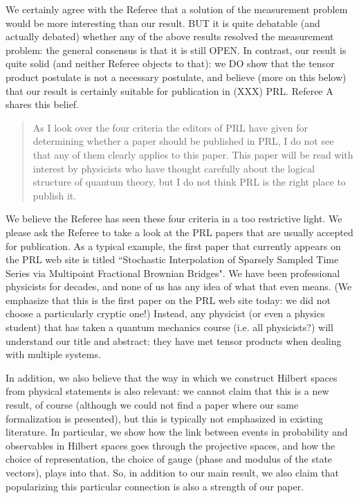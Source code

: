 \documentclass[11pt]{article}
\begin{document}
We certainly agree with the Referee that a solution of the measurement
problem would be more interesting than our result. BUT it is quite
debatable (and actually debated) whether any of the above results
resolved the measurement problem: the general consensus is that it is
still OPEN. In contrast, our result is quite solid (and neither
Referee objects to that): we DO show that the tensor product postulate
is not a necessary postulate, and believe (more on this below) that
our result is certainly suitable for publication in (XXX) PRL. Referee A
shares this belief.

\begin{quote}
As I look over the four criteria the editors of PRL have
given for determining whether a paper should be published in PRL, I do
not see that any of them clearly applies to this paper. This paper
will be read with interest by physicists who have thought carefully
about the logical structure of quantum theory, but I do not think PRL
is the right place to publish it.
\end{quote}

We believe the Referee has seen these four criteria in a too
restrictive light. We please ask the Referee to take a look at the PRL
papers that are usually accepted for publication. As a typical
example, the first paper that currently appears on the PRL web site is
titled ``Stochastic Interpolation of Sparsely Sampled Time Series via
Multipoint Fractional Brownian Bridges". We have been professional
physicists for decades, and none of us has any idea of what that even
means. (We emphasize that this is the first paper on the PRL web site
today: we did not choose a particularly cryptic one!) Instead, any
physicist (or even a physics student) that has taken a quantum
mechanics course (i.e. all physicists?) will understand our title and
abstract: they have met tensor products when dealing with multiple
systems.

In addition, we also believe that the way in which we construct
Hilbert spaces from physical statements is also relevant: we cannot
claim that this is a new result, of course (although we could not find
a paper where our same formalization is presented), but this is
typically not emphasized in existing literature. In particular, we
show how the link between events in probability and observables in
Hilbert spaces goes through the projective spaces, and how the choice
of representation, the choice of gauge (phase and modulus of the state
vectors), plays into that. So, in addition to our main result, we also
claim that popularizing this particular connection is also a strength
of our paper.
\end{document}
